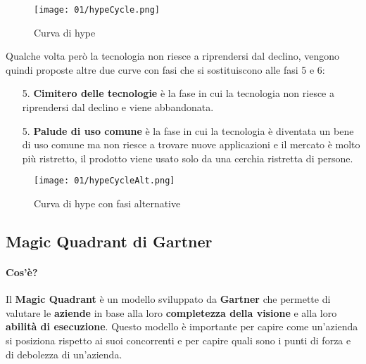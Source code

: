         \begin{figure}[H]
            \centering
            \texttt{[image: 01/hypeCycle.png]}
            \caption{Curva di hype}
        \end{figure}
        Qualche volta però la tecnologia non riesce a riprendersi dal declino, vengono quindi proposte altre due curve con fasi che si sostituiscono alle fasi 5 e 6:
        \begin{enumerate}
            \item[5.] \textbf{Cimitero delle tecnologie} è la fase in cui la tecnologia non riesce a riprendersi dal declino e viene abbandonata.
            \item[5.] \textbf{Palude di uso comune} è la fase in cui la tecnologia è diventata un bene di uso comune ma non riesce a trovare nuove applicazioni e il mercato è molto più ristretto, il prodotto viene usato solo da una cerchia ristretta di persone.
        \end{enumerate}
        \begin{figure}[H]
            \centering
            \texttt{[image: 01/hypeCycleAlt.png]}
            \caption{Curva di hype con fasi alternative}
        \end{figure}
    \subsection{Magic Quadrant di Gartner}
        \paragraph{Cos'è?} Il \textbf{Magic Quadrant} è un modello sviluppato da \textbf{Gartner} che permette di valutare le \textbf{aziende} in base alla loro \textbf{completezza della visione} e alla loro \textbf{abilità di esecuzione}. Questo modello è importante per capire come un'azienda si posiziona rispetto ai suoi concorrenti e per capire quali sono i punti di forza e di debolezza di un'azienda.
